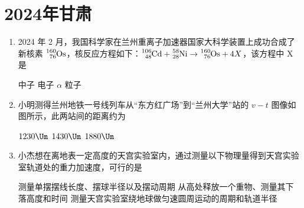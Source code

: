 \documentclass[\gkver]{gaokaozhenti}
\begin{document}
\chapter{2024年甘肃}

\begin{enumerate}
\item
2024 年 2 月，我国科学家在兰州重离子加速器国家大科学装置上成功合成了新核素 $\ce{^{160}_{76}Os}$，核反应方程如下：$\ce{^{106}_{48}Cd} + \ce{^{58}_{28}Ni} \to \ce{^{160}_{76}Os} + 4X$，该方程中 X 是

{中子}
{电子}
{$\alpha$ 粒子}


\item
小明测得兰州地铁一号线列车从“东方红广场”到“兰州大学”站的 $v - t$ 图像如图所示，此两站间的距离约为


\fourchoices[answer=C]
{$980 \Um$}
{$1230 \Um$}
{$1430 \Um$}
{$1880 \Um$}


\item
小杰想在离地表一定高度的天宫实验室内，通过测量以下物理量得到天宫实验室轨道处的重力加速度，可行的是

{测量单摆摆线长度、摆球半径以及摆动周期}
{从高处释放一个重物、测量其下落高度和时间}
{测量天宫实验室绕地球做匀速圆周运动的周期和轨道半径}

\end{enumerate}
\end{document}
